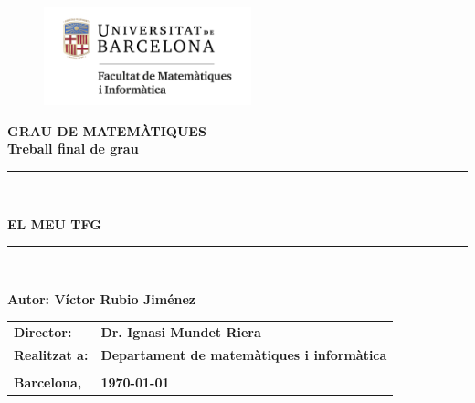 \documentclass[11pt,a4paper,openright,oneside]{book}
\numberwithin{equation}{section}
\theoremstyle{definition}
\begin{document}

\thispagestyle{empty}

\begin{titlepage}
\begin{center}
\begin{figure}[htb]
\begin{center}
\includegraphics[width=6cm]{matematiquesinformatica-pos-rgb.png}
\end{center}
\end{figure}

\vspace*{1cm}
\textbf{\LARGE GRAU DE MATEM\`{A}TIQUES } \\
\vspace*{.5cm}
\textbf{\LARGE Treball final de grau} \\

\vspace*{1.5cm}
\rule{16cm}{0.1mm}\\
\begin{Huge}
\textbf{EL MEU TFG} \\
\end{Huge}
\rule{16cm}{0.1mm}\\

\vspace{1cm}

\begin{flushright}
\textbf{\LARGE Autor: Víctor Rubio Jiménez}

\vspace*{2cm}

\renewcommand{\arraystretch}{1.5}
\begin{tabular}{ll}
\textbf{\Large Director:} & \textbf{\Large Dr. Ignasi Mundet Riera } \\
\textbf{\Large Realitzat a:} & \textbf{\Large  Departament de matemàtiques i informàtica   } \\
\\
\textbf{\Large Barcelona,} & \textbf{\Large \today }
\end{tabular}

\end{flushright}

\end{center}










\end{titlepage}
\end{document}

